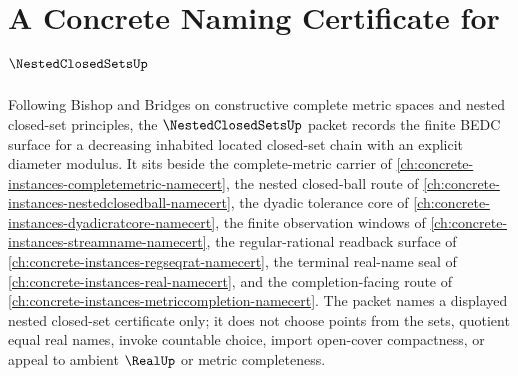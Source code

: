 \chapter{A Concrete Naming Certificate for $\NestedClosedSetsUp$}
\label{ch:concrete-instances-nested-closed-sets-namecert}

Following Bishop and Bridges on constructive complete metric spaces and nested closed-set principles, the $\NestedClosedSetsUp$ packet records the finite BEDC surface for a decreasing inhabited located closed-set chain with an explicit diameter modulus. It sits beside the complete-metric carrier of \autoref{ch:concrete-instances-completemetric-namecert}, the nested closed-ball route of \autoref{ch:concrete-instances-nestedclosedball-namecert}, the dyadic tolerance core of \autoref{ch:concrete-instances-dyadicratcore-namecert}, the finite observation windows of \autoref{ch:concrete-instances-streamname-namecert}, the regular-rational readback surface of \autoref{ch:concrete-instances-regseqrat-namecert}, the terminal real-name seal of \autoref{ch:concrete-instances-real-namecert}, and the completion-facing route of \autoref{ch:concrete-instances-metriccompletion-namecert}. The packet names a displayed nested closed-set certificate only; it does not choose points from the sets, quotient equal real names, invoke countable choice, import open-cover compactness, or appeal to ambient $\RealUp$ or metric completeness.

